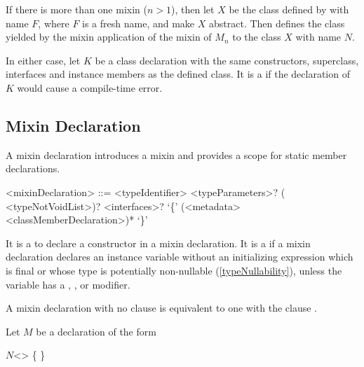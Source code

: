 \documentclass[makeidx]{article}
\begin{document}
\LMHash{}%
If there is more than one mixin ($n > 1$), then
let $X$ be the class defined by 
with name $F$, where $F$ is a fresh name, and make $X$ abstract.
Then  defines the class yielded
by the mixin application of the mixin of $M_n$ to the class $X$ with name $N$.

\LMHash{}%
In either case, let $K$ be a class declaration with
the same constructors, superclass, interfaces and instance members as
the defined class.
It is a  if the declaration of $K$ would cause
a compile-time error.


\subsection{Mixin Declaration}

\LMHash{}%
A mixin declaration introduces a mixin and provides a scope
for static member declarations.

\begin{grammar}
<mixinDeclaration> ::= \MIXIN{} <typeIdentifier> <typeParameters>?
  \gnewline{} (\ON{} <typeNotVoidList>)? <interfaces>?
  \gnewline{} `\{' (<metadata> <classMemberDeclaration>)* `\}'
\end{grammar}

\LMHash{}%
It is a
 to declare a constructor in a mixin declaration.
It is a  if a mixin declaration declares
an instance variable without an initializing expression
which is final or whose type is potentially non-nullable
(\ref{typeNullability}),
unless the variable has a \LATE, \ABSTRACT, or \EXTERNAL{} modifier.

\LMHash{}%
A mixin declaration with no \code{\ON} clause is equivalent
to one with the clause .

\LMHash{}%
Let $M$ be a \MIXIN{} declaration of the form

\begin{normativeDartCode}
\MIXIN{} $N$<\TypeParametersStd> \ON{} 
    \IMPLEMENTS{}  \{
\}
\end{normativeDartCode}
\end{document}
